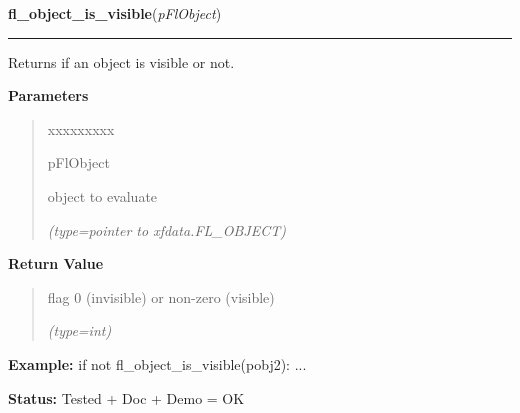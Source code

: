 \hspace{.8\funcindent}\begin{boxedminipage}{\funcwidth}

    \raggedright \textbf{fl\_object\_is\_visible}(\textit{pFlObject})

    \vspace{-1.5ex}

    \rule{\textwidth}{0.5\fboxrule}
\setlength{\parskip}{2ex}
    Returns if an object is visible or not.

\setlength{\parskip}{1ex}
      \textbf{Parameters}
      \vspace{-1ex}

      \begin{quote}
        \begin{Ventry}{xxxxxxxxx}

          \item[pFlObject]

          object to evaluate

            {\it (type=pointer to xfdata.FL\_OBJECT)}

        \end{Ventry}

      \end{quote}

      \textbf{Return Value}
    \vspace{-1ex}

      \begin{quote}
      flag 0 (invisible) or non-zero (visible)

      {\it (type=int)}

      \end{quote}

\textbf{Example:} if not fl\_object\_is\_visible(pobj2): ...



\textbf{Status:} Tested + Doc + Demo = OK



    \end{boxedminipage}

    \label{xformslib:flbasic:fl_free_object}

    \vspace{0.5ex}

